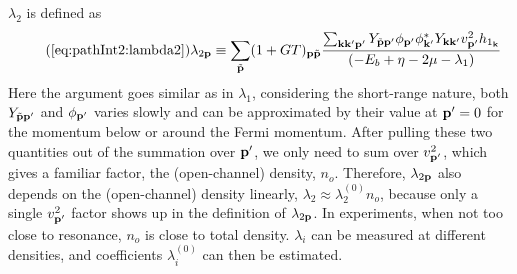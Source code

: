  $\lambda_2$ is defined as
\begin{equation}\tag{\ref{eq:pathInt2:lambda2}}
\lambda_{2\vp}\equiv\sum_{\tilde\vp}(1+GT)_{\vp\tilde\vp}\frac{\sum_{\vk\vk{'}\vp'} Y_{\tilde\vp\vp'}{\phi_{\vp'}}{\phi_{\vk'}^{*}}{Y_{\vk\vk'}}v_{\vp'}^{2}{h_{1_{\vk}}}}
		{\br{-E_{b}+\eta-2\mu-\lambda_{1}}}{}
\end{equation}
Here the argument goes similar as in $\lambda_{1}$, considering the short-range nature, both  $Y_{\tilde{\mathbf{p}}\mathbf{p}'}$ and $\phi_{\mathbf{p}'}$ varies slowly and can be approximated by their value at $\mathbf{p}'=0$ for the momentum below or around the Fermi momentum.  After pulling these two quantities out of the summation over $\mathbf{p}'$, we only need to sum over   $v_{\mathbf{p}'}^{2}$, which gives a familiar factor,  the (open-channel) density, $n_{o}$. Therefore,  $\lambda_{2\mathbf{p}}$ also depends on the (open-channel) density linearly, $\lambda_2\approx\lambda_2^{(0)}n_{o}$,  because only a single $v_{\mathbf{p}'}^2$ factor shows up  in the definition of $\lambda_{2\mathbf{p}}$.  In experiments, when not too close to resonance, $n_o$ is close to total density.  $\lambda_{i}$ can be measured at different densities,  and coefficients $\lambda_{i}^{(0)}$ can then be estimated. 






